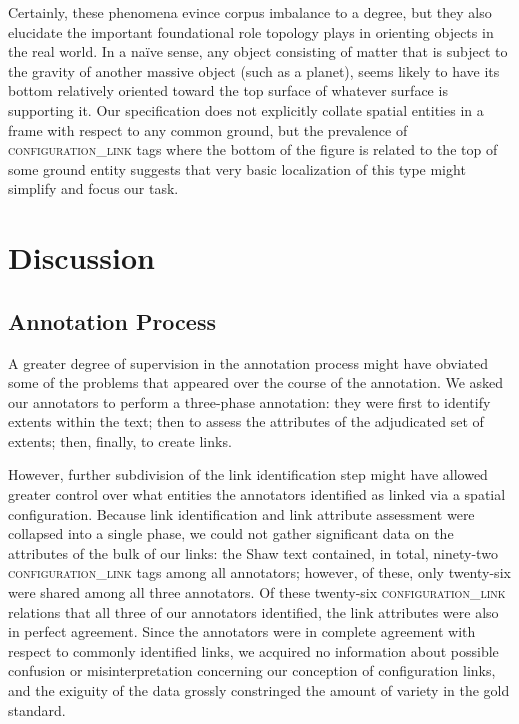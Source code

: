 \documentclass[11pt]{article}
\begin{document}
Certainly, these phenomena evince corpus imbalance to a degree, but they also elucidate the important foundational role topology plays in orienting objects in the real world. In a naïve sense, any object consisting of matter that is subject to the gravity of another massive object (such as a planet), seems likely to have its bottom relatively oriented toward the top surface of whatever surface is supporting it. Our specification does not explicitly collate spatial entities in a frame with respect to any common ground, but the prevalence of \textsc{configuration\_link} tags where the bottom of the figure is related to the top of some ground entity suggests that very basic localization of this type might simplify and focus our task.


\section{Discussion} %
\label{sec:discussion}

\subsection{Annotation Process} %
\label{subsec:annotation_process}

A greater degree of supervision in the annotation process might have obviated some of the problems that appeared over the course of the annotation. We asked our annotators to perform a three-phase annotation: they were first to identify extents within the text; then to assess the attributes of the adjudicated set of extents; then, finally, to create links. 

However, further subdivision of the link identification step might have allowed greater control over what entities the annotators identified as linked via a spatial configuration. Because link identification and link attribute assessment were collapsed into a single phase, we could not gather significant data on the attributes of the bulk of our links: the Shaw text contained, in total, ninety-two \textsc{configuration\_link} tags among all annotators; however, of these, only twenty-six were shared among all three annotators. Of these twenty-six \textsc{configuration\_link} relations that all three of our annotators identified, the link attributes were also in perfect agreement. Since the annotators were in complete agreement with respect to commonly identified links, we acquired no information about possible confusion or misinterpretation concerning our conception of configuration links, and the exiguity of the data grossly constringed the amount of variety in the gold standard.
\end{document}
